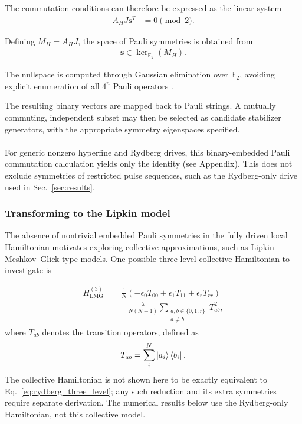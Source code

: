 \documentclass[amssymb,twocolumn,aps]{revtex4-2}
\begin{document}
The commutation conditions can therefore be
expressed as the linear system
\begin{align*}
    A_H J \mathbf{s}^{T}
    &= 0 \pmod 2.
\end{align*}

Defining $M_H=A_HJ$, the space of Pauli
symmetries is obtained from
\begin{align*}
    \mathbf{s} \in \ker_{\mathbb{F}_2}(M_H).
\end{align*}

The nullspace is computed through Gaussian
elimination over $\mathbb{F}_2$, avoiding
explicit enumeration of all $4^n$ Pauli
operators \cite{Nagpal2026}.

The resulting binary vectors are mapped back
to Pauli strings. A mutually commuting,
independent subset may then be selected as
candidate stabilizer generators, with the
appropriate symmetry eigenspaces specified.
\\\\
For generic nonzero hyperfine and Rydberg drives, this binary-embedded
Pauli commutation calculation yields only the identity (see Appendix).
This does not exclude symmetries of restricted pulse sequences, such
as the Rydberg-only drive used in Sec.~\ref{sec:results}.
\subsubsection{Transforming to the Lipkin model}
The absence of nontrivial embedded Pauli symmetries in the fully driven
local Hamiltonian motivates exploring collective approximations, such as
Lipkin--Meshkov--Glick-type models. One possible three-level collective
Hamiltonian to investigate is

\begin{equation}
\begin{aligned}
H_{\mathrm{LMG}}^{(3)}
={}&\frac{1}{N}
\left(
-\epsilon_0 T_{00}
+\epsilon_1 T_{11}
+\epsilon_r T_{rr}
\right)\\
&-\frac{\lambda}{N(N-1)}
\sum_{\substack{a,b\in\{0,1,r\}\\a\neq b}}
T_{ab}^{2},
\end{aligned}
\end{equation}
where $T_{ab}$ denotes the transition operators, defined as
\begin{equation*}
    T_{ab} = \sum_i^N \ket{a_i}\bra{b_i}.
\end{equation*}
The collective Hamiltonian is not shown here to be exactly equivalent to
Eq.~\eqref{eq:rydberg_three_level}; any such reduction and its extra
symmetries require separate derivation. The numerical results below use
the Rydberg-only Hamiltonian, not this collective model.
\end{document}
